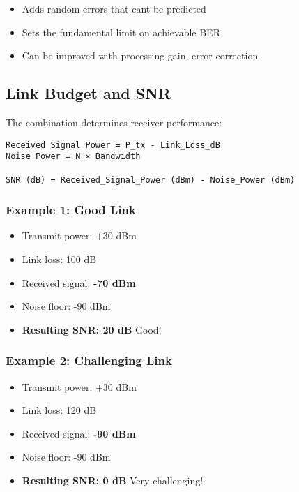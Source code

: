 \begin{itemize}
\tightlist
\item
  Adds random errors that can\textquotesingle t be predicted
\item
  Sets the fundamental limit on achievable BER
\item
  Can be improved with processing gain, error correction
\end{itemize}

\subsection{Link Budget and SNR}\label{link-budget-and-snr}

The combination determines receiver performance:

\begin{verbatim}
Received Signal Power = P_tx - Link_Loss_dB
Noise Power = N × Bandwidth

SNR (dB) = Received_Signal_Power (dBm) - Noise_Power (dBm)
\end{verbatim}

\subsubsection{Example 1: Good Link}\label{example-1-good-link}

\begin{itemize}
\tightlist
\item
  Transmit power: +30 dBm
\item
  Link loss: 100 dB
\item
  Received signal: \textbf{-70 dBm}
\item
  Noise floor: -90 dBm
\item
  \textbf{Resulting SNR: 20 dB} Good!
\end{itemize}

\subsubsection{Example 2: Challenging
Link}\label{example-2-challenging-link}

\begin{itemize}
\tightlist
\item
  Transmit power: +30 dBm
\item
  Link loss: 120 dB
\item
  Received signal: \textbf{-90 dBm}
\item
  Noise floor: -90 dBm
\item
  \textbf{Resulting SNR: 0 dB} Very challenging!
\end{itemize}

